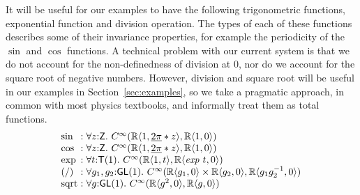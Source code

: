 \documentclass[preprint]{sigplanconf}
\theoremstyle{examplestyle}
\begin{document}
It will be useful for our examples to have the following trigonometric
functions, exponential function and division operation. The types of
each of these functions describes some of their invariance properties,
for example the periodicity of the $\sin$ and $\cos$ functions. A
technical problem with our current system is that we do not account
for the non-definedness of division at $0$, nor do we account for the
square root of negative numbers. However, division and square root
will be useful in our examples in Section~\ref{sec:examples}, so we
take a pragmatic approach, in common with most physics textbooks, and
informally treat them as total functions.
\begin{displaymath}
  \begin{array}{l@{\hspace{0.3em}}c@{\hspace{0.3em}}l}
    \sin &:& \forall z \mathord: \mathsf{Z}.~C^\infty(\mathbb{R}\langle 1, \underline{2\pi} * z \rangle, \mathbb{R} \langle 1, 0 \rangle) \\
    \cos &:& \forall z \mathord: \mathsf{Z}.~C^\infty(\mathbb{R}\langle 1, \underline{2\pi} * z \rangle, \mathbb{R} \langle 1, 0 \rangle) \\
    \mathrm{exp} &:& \forall t \mathord: \mathsf{T}(1).~C^\infty(\mathbb{R}\langle 1, t \rangle, \mathbb{R}\langle \mathit{exp}~t, 0 \rangle) \\
    (/) &:& \forall g_1, g_2 \mathord: \mathsf{GL}(1).~C^\infty(\mathbb{R}\langle g_1, 0 \rangle \times \mathbb{R}\langle g_2, 0\rangle, \mathbb{R}\langle g_1g_2^{-1}, 0 \rangle) \\
    \mathrm{sqrt} &:& \forall g \mathord: \mathsf{GL}(1).~C^\infty(\mathbb{R}\langle g^2, 0 \rangle, \mathbb{R}\langle g, 0 \rangle)
  \end{array}
\end{displaymath}
\end{document}

